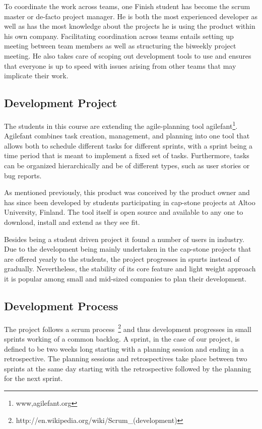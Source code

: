 To coordinate the work across teams, one Finish student has become the scrum master or de-facto project manager.
He is both the most experienced developer as well as has the most knowledge about the projects he is using the product within his own company.
Facilitating coordination across teams entails setting up meeting between team members as well as structuring the biweekly project meeting.
He also takes care of scoping out development tools to use and ensures that everyone is up to speed with issues arising from other teams that may implicate their work.

\subsection{Development Project}
\label{chap:make:subset:devproject}
The students in this course are extending the agile-planning tool agilefant\footnote{www,agilefant.org}.
Agilefant combines task creation, management, and planning into one tool that allows both to schedule different tasks for different sprints, with a sprint being a time period that is meant to implement a fixed set of tasks.
Furthermore, tasks can be organized hierarchically and be of different types, such as user stories or bug reports.
 
As mentioned previously, this product was conceived by the product owner and has since been developed by students participating in cap-stone projects at Altoo University, Finland.
The tool itself is open source and available to any one to download, install and extend as they see fit.

Besides being a student driven project it found a number of users in industry.
Due to the development being mainly undertaken in the cap-stone projects that are offered yearly to the students, the project progresses in spurts instead of gradually.
Nevertheless, the stability of its core feature and light weight approach it is popular among small and mid-sized companies to plan their development.

\subsection{Development Process}
The project follows a scrum process~\footnote{http://en.wikipedia.org/wiki/Scrum\_(development)} and thus development progresses in small sprints working of a common backlog.
A sprint, in the case of our project, is defined to be two weeks long starting with a planning session and ending in a retrospective.
The planning sessions and retrospectives take place between two sprints at the same day starting with the retrospective followed by the planning for the next sprint.

